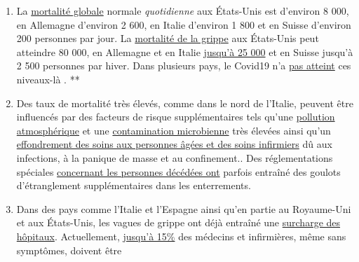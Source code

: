 \begin{enumerate}
{  mortes} du Covid19, ou alors elles étaient déjà
  \href{https://sports.yahoo.com/spanish-football-coach-francisco-garcia-163153573.html}{gravement
  malades} auparavant (par exemple une leucémie non détectée), ou ils
  avaient
  \href{https://www.n-tv.de/panorama/Neunjaehrige-Corona-Tote-war-109-Jahre-alt-article21753784.html}{109
  ans au lieu de 9 ans}.
\item
  La
  \href{https://www.cdc.gov/mmwr/volumes/68/wr/mm6826a5.htm}{mortalité
  globale} normale \emph{quotidienne} aux États-Unis est d'environ 8
  000, en Allemagne d'environ 2 600, en Italie d'environ 1 800 et en
  Suisse d'environ 200 personnes par jour. La
  \href{https://www.statnews.com/2018/09/26/cdc-us-flu-deaths-winter/}{mortalité
  de la grippe} aux États-Unis peut atteindre 80 000, en Allemagne et en
  Italie
  \href{https://www.sciencedirect.com/science/article/pii/S1201971219303285}{jusqu'à
  25 000} et en Suisse jusqu'à 2 500 personnes par hiver. Dans plusieurs
  pays, le Covid19 n'a
  \href{https://www.euromomo.eu/graphs-and-maps/}{pas atteint} ces
  niveaux-là . **
\item
  Des taux de mortalité très élevés, comme dans le nord de l'Italie,
  peuvent être influencés par des facteurs de risque supplémentaires
  tels qu'une
  \href{https://www.theguardian.com/environment/2020/apr/20/air-pollution-may-be-key-contributor-to-covid-19-deaths-study?utm_medium}{pollution
  atmosphérique} et une
  \href{https://www.ansa.it/english/news/science_tecnology/2019/11/19/italy-top-in-eu-in-antibiotic-resistance_369e0123-0107-445e-8c17-f11932c9d27c.html}{contamination
  microbienne} très élevées ainsi qu'un
  \href{https://swprs.org/covid-19-a-report-from-italy/}{effondrement
  des soins aux personnes âgées et des soins infirmiers} dû aux
  infections, à la panique de masse et au confinement.. Des
  réglementations spéciales
  \href{https://www.ecdc.europa.eu/sites/default/files/documents/COVID-19-safe-handling-of-bodies-or-persons-dying-from-COVID19.pdf}{concernant
  les personnes décédées ont} parfois entraîné des goulots
  d'étranglement supplémentaires dans les enterrements.
\item
  Dans des pays comme l'Italie et l'Espagne ainsi qu'en partie au
  Royaume-Uni et aux États-Unis, les vagues de grippe ont déjà entraîné
  une
  \href{https://off-guardian.org/2020/04/02/coronavirus-fact-check-1-flu-doesnt-overwhelm-our-hospitals/}{surcharge
  des hôpitaux}. Actuellement,
  \href{https://www.reuters.com/article/us-health-coronavirus-spain-morgue-idUSKBN21B1PP}{jusqu'à
  15\%} des médecins et infirmières, même sans symptômes, doivent être

\end{enumerate}
